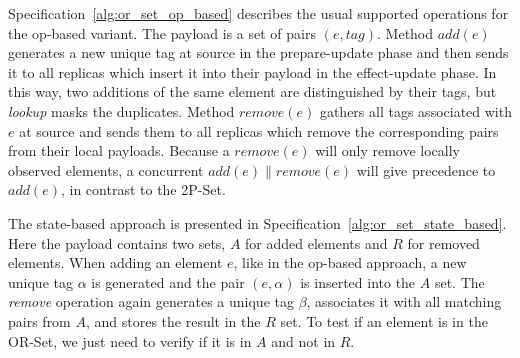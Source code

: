 Specification~\ref{alg:or_set_op_based} describes the usual supported operations
for the op-based variant. The payload is a set of pairs
$(\textit{e},\textit{tag})$. Method $\textit{add}(e)$ generates a new unique tag
at source in the prepare-update phase and then sends it to all replicas which
insert it into their payload in the effect-update phase. In this way, two
additions of the same element are distinguished by their tags, but
\textit{lookup} masks the duplicates. Method $\textit{remove}(e)$ gathers all
tags associated with $e$ at source and sends them to all replicas which remove
the corresponding pairs from their local payloads. Because a
$\textit{remove}(e)$ will only remove locally observed elements, a concurrent
$\textit{add}(e) \parallel \textit{remove}(e)$ will give precedence to
$\textit{add}(e)$, in contrast to the 2P-Set.

The state-based approach is presented in
Specification~\ref{alg:or_set_state_based}. Here the payload contains two sets,
$A$ for added elements and $R$ for removed elements. When adding an element $e$,
like in the op-based approach, a new unique tag $\alpha$ is generated and the
pair $(e, \alpha)$ is inserted into the $A$ set. The \textit{remove} operation
again generates a unique tag $\beta$, associates it with all matching pairs from
$A$, and stores the result in the $R$ set. To test if an element is in the
OR-Set, we just need to verify if it is in $A$ and not in $R$.
